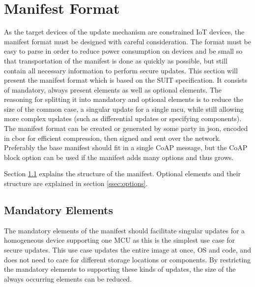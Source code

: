 \documentclass[0-thesis.tex]{subfiles}
\begin{document}

\section{Manifest Format}
\label{sec:manifest-format}
As the target devices of the update mechanism are constrained IoT devices, the manifest
format must be designed with careful consideration. The format must be easy to parse in
order to reduce power consumption on devices and be small so that transportation of the
manifest is done as quickly as possible, but still contain all necessary information to
perform secure updates. This section will present the manifest format which is based on
the SUIT specification. It consists of mandatory, always present elements as well as
optional elements. The reasoning for splitting it into mandatory and optional elements is
to reduce the size of the common case, a singular update for a single \gls{mcu}, while
still allowing more complex updates (such as differential updates or specifying
components). The manifest format can be created or generated by some party in \gls{json},
encoded in \gls{cbor} for efficient compression, then signed and sent over the network.
Preferably the base manifest should fit in a single CoAP message, but the CoAP block
option can be used if the manifest adds many options and thus grows.

Section \ref{ssec:mandatory-elements} explains the structure of the manifest. Optional
elements and their structure are explained in section \ref{ssec:options}. 

\subsection{Mandatory Elements}
\label{ssec:mandatory-elements}
The mandatory elements of the manifest should facilitate singular updates for a homogeneous
device supporting one MCU as this is the simplest use case for secure updates. This use
case updates the entire image at once, OS and code, and does not need to care for
different storage locations or components. By restricting the mandatory elements to
supporting these kinds of updates, the size of the always occurring elements can be
reduced. 
\end{document}

